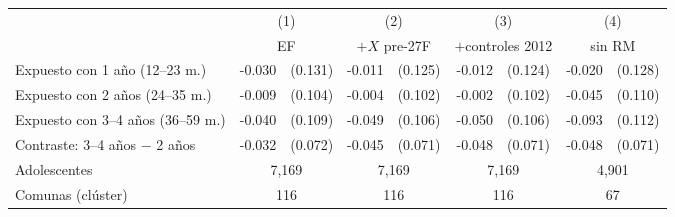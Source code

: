 \begin{tabular}{l rl rl rl rl}
\toprule
 & \multicolumn{2}{c}{(1)} & \multicolumn{2}{c}{(2)} & \multicolumn{2}{c}{(3)} & \multicolumn{2}{c}{(4)} \\
 & \multicolumn{2}{c}{EF} & \multicolumn{2}{c}{$+X$ pre-27F} & \multicolumn{2}{c}{$+$controles 2012} & \multicolumn{2}{c}{sin RM} \\
\midrule
Expuesto con 1 a\~no (12--23 m.) & -0.030 & (0.131) & -0.011 & (0.125) & -0.012 & (0.124) & -0.020 & (0.128) \\
Expuesto con 2 a\~nos (24--35 m.) & -0.009 & (0.104) & -0.004 & (0.102) & -0.002 & (0.102) & -0.045 & (0.110) \\
Expuesto con 3--4 a\~nos (36--59 m.) & -0.040 & (0.109) & -0.049 & (0.106) & -0.050 & (0.106) & -0.093 & (0.112) \\
\addlinespace
Contraste: 3--4 a\~nos $-$ 2 a\~nos & -0.032 & (0.072) & -0.045 & (0.071) & -0.048 & (0.071) & -0.048 & (0.071) \\
\midrule
Adolescentes & \multicolumn{2}{c}{7,169} & \multicolumn{2}{c}{7,169} & \multicolumn{2}{c}{7,169} & \multicolumn{2}{c}{4,901} \\
Comunas (cl\'uster) & \multicolumn{2}{c}{116} & \multicolumn{2}{c}{116} & \multicolumn{2}{c}{116} & \multicolumn{2}{c}{67} \\
\bottomrule
\end{tabular}
